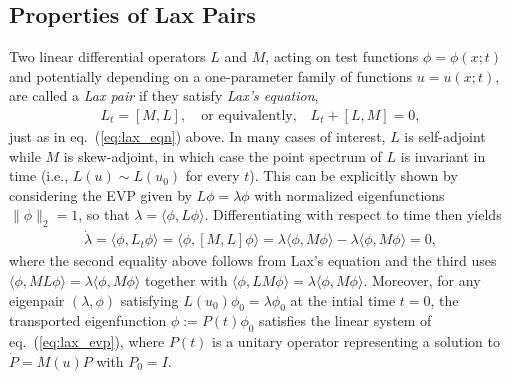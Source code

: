 \documentclass[journal=gmj]{CUP-JNL-DTM}%
\theoremstyle{definition}
\numberwithin{equation}{section}
\begin{document}
\begin{appendix}
\section{Properties of Lax Pairs}\label{appendixB:lax_pairs}
Two linear differential operators $L$ and $M$, acting on test functions $\phi = \phi(x;t)$ and potentially depending on a one-parameter family of functions $u = u(x;t)$, are called a \textit{Lax pair} if they satisfy \textit{Lax's equation}, \begin{align*}
    L_t = [M,L],
    \quad \text{or equivalently,} \quad
    L_t + [L,M] = 0,
\end{align*} just as in eq.~(\ref{eq:lax_eqn}) above. In many cases of interest, $L$ is self-adjoint while $M$ is skew-adjoint, in which case the point spectrum of $L$ is invariant in time (i.e., $L(u) \sim L(u_0)$ for every $t$). This can be explicitly shown by considering the EVP given by $L\phi = \lambda\phi$ with normalized eigenfunctions $\|\phi\|_2 = 1$, so that $\lambda = \langle \phi, L\phi\rangle$. Differentiating with respect to time then yields \begin{align*}
    \dot{\lambda}
    = \langle \phi, L_t\phi\rangle
    = \langle \phi, [M,L]\phi\rangle
    = \lambda\langle \phi, M\phi\rangle - \lambda\langle \phi, M\phi\rangle
    = 0,
\end{align*} where the second equality above follows from Lax's equation and the third uses $\langle \phi, ML\phi\rangle = \lambda\langle\phi, M\phi\rangle$ together with $\langle\phi, LM\phi\rangle = \lambda\langle\phi, M\phi\rangle$. Moreover, for any eigenpair $(\lambda, \phi)$ satisfying $L(u_0)\phi_0 = \lambda\phi_0$ at the intial time $t = 0$, the transported eigenfunction $\phi := P(t)\phi_0$ satisfies the linear system of eq.~(\ref{eq:lax_evp}), where $P(t)$ is a unitary operator representing a solution to $\dot{P} = M(u) P$ with $P_0 = I$.



\end{appendix}
\end{document}
